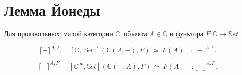 \documentclass[
  russian,
  aspectratio=169,
  xcolor={svgnames},
  hyperref={colorlinks,citecolor=DeepPink4,linkcolor=DarkRed,urlcolor=DarkBlue}]{beamer}
\begin{document}
\section{Лемма Йонеды}

\begin{frame}[fragile]
Для произвольных: малой категории $\mathbb{C}$, объекта $A\in\mathbb{C}$ и функтора $F: \mathbb{C} \rightarrow \mathbb{S}et$

\begin{lemma}
$$
\lceil- \rceil^{A, F}:\quad
[\mathbb{C}, \operatorname{Set}](\mathbb{C}(A,-), F) \ \simeq\ F(A) 
\quad:\lfloor-\rfloor^{A, F}.
$$
\end{lemma}

\begin{lemma}
$$
\lceil- \rceil^{A, F} :\quad
[\mathbb{C}^{op}, \mathbb{S}et](\mathbb{C}(-,A), F) \ \simeq\  F(A) 
\quad:\lfloor-\rfloor^{A, F}.
$$
\end{lemma}
\end{frame}
\end{document}
